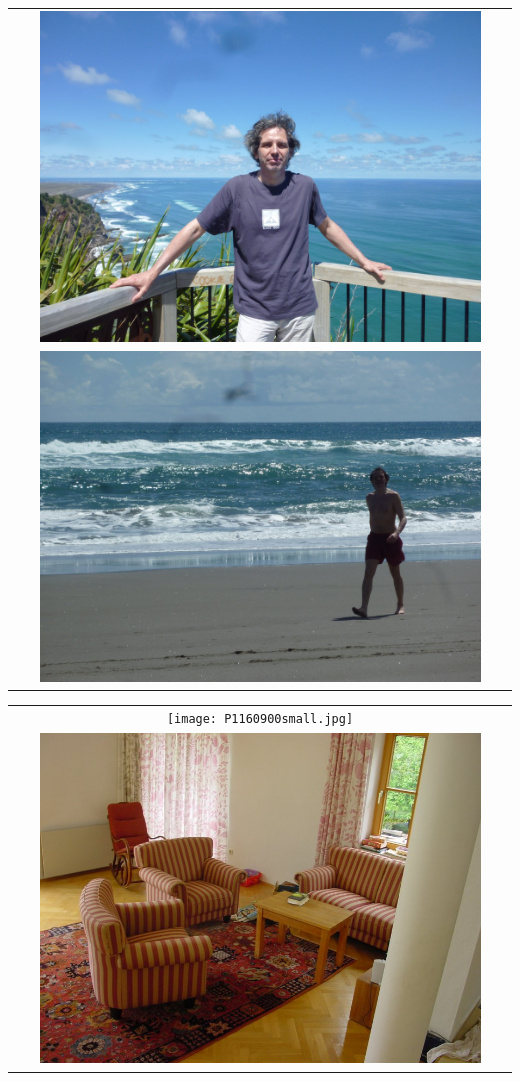 \documentclass[11pt,a4paper]{moderncv}
\begin{document}
\begin{center}
\begin{tabular}{c}
\includegraphics[width=0.9\textwidth]{2012-P1170444sm.jpg} \\
\includegraphics[width=0.9\textwidth]{2012-P1170610sm.jpg} \\
\end{tabular}
\end{center}
\newpage
\begin{center}
\begin{tabular}{c}
\texttt{[image: P1160900small.jpg]} \\
\includegraphics[width=0.9\textwidth]{2012-DSC01868.jpg} \\
\end{tabular}
\end{center}
\end{document}

